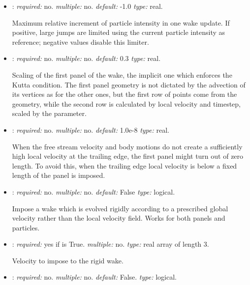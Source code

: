 \begin{itemize}
Maximum particle intensity allowed during wake update. If positive, values
above this threshold are clamped; set a negative value to disable this check.

\item {}: \textit{required:} no.
\textit{multiple:} no. \textit{default:} -1.0 \textit{type:} real.

Maximum relative increment of particle intensity in one wake update. If
positive, large jumps are limited using the current particle intensity as
reference; negative values disable this limiter.

\item {}: \textit{required:} no. \textit{multiple:} no. 
\textit{default:} 0.3 \textit{type:} real.

Scaling of the first panel of the wake, the implicit one which enforces the Kutta 
condition. The first panel geometry is not dictated by the advection of its 
vertices as for the other ones, but the first row of points come from the geometry, 
while the second row is calculated by local velocity and timestep, 
scaled by the  parameter.


\item {}: \textit{required:} no. \textit{multiple:} no. 
\textit{default:} 1.0e-8 \textit{type:} real.

When the free stream velocity and body motions do not create a sufficiently high 
local velocity at the trailing edge, the first panel might turn out of zero length. 
To avoid this, when the trailing edge local velocity is below 
 a fixed length of the panel is imposed.

\item {}: \textit{required:} no. \textit{multiple:} no. 
\textit{default:} False \textit{type:} logical.

Impose a wake which is evolved rigidly according to a prescribed global 
velocity rather than the local velocity field. Works for both panels and 
particles.

\item {}: \textit{required:} yes if  is True. 
\textit{multiple:} no. \textit{type:} real array of length 3.

Velocity to impose to the rigid wake.

\item {}: \textit{required:} no. \textit{multiple:} no. 
\textit{default:} False. \textit{type:} logical.


\end{itemize}

